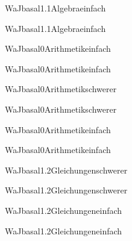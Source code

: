 \documentclass[12pt]{article}
\begin{document}
\begin{Add}{WaJ}{basal1.1}{Algebra}{einfach}
\solution{ }
\end{Add}
\begin{Add}{WaJ}{basal1.1}{Algebra}{einfach}
\end{Add}

\begin{Add}{WaJ}{basal0}{Arithmetik}{einfach}
\solution{ }
\end{Add}
\begin{Add}{WaJ}{basal0}{Arithmetik}{einfach}
\end{Add}

\begin{Add}{WaJ}{basal0}{Arithmetik}{schwerer}
\solution{ }
\end{Add}
\begin{Add}{WaJ}{basal0}{Arithmetik}{schwerer}
\end{Add}

\begin{Add}{WaJ}{basal0}{Arithmetik}{einfach}
\solution{ }
\end{Add}
\begin{Add}{WaJ}{basal0}{Arithmetik}{einfach}
\end{Add}

\begin{Add}{WaJ}{basal1.2}{Gleichungen}{schwerer}
\solution{ }
\end{Add}
\begin{Add}{WaJ}{basal1.2}{Gleichungen}{schwerer}
\end{Add}

\begin{Add}{WaJ}{basal1.2}{Gleichungen}{einfach}
\solution{ }
\end{Add}
\begin{Add}{WaJ}{basal1.2}{Gleichungen}{einfach}
\end{Add}
\end{document}
